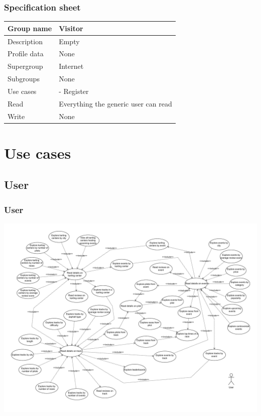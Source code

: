 \documentclass{beamer}
\begin{document}
\begin{frame}
    \frametitle{Specification sheet}
    \begin{table}
        \tiny
        \begin{tabular}{|p{2cm}|p{6cm}|}
        \hline
        Group name & \textbf{Visitor} \\
        \hline
        Description & Empty \\
        \hline
        Profile data & None \\
        Supergroup & Internet \\
        \hline
        Subgroups & None \\
        \hline
        Use cases &
        - Register \\
        \hline
        Read & Everything the generic user can read \\
        \hline
        Write & None \\
        \hline
        \end{tabular}
    \end{table}
\end{frame}




\section*{Use cases}

\subsection*{User}

\begin{frame}
    \frametitle{User}
    \centering
    \includegraphics[width=0.8\linewidth]{drawio/user.pdf}
\end{frame}
\end{document}
